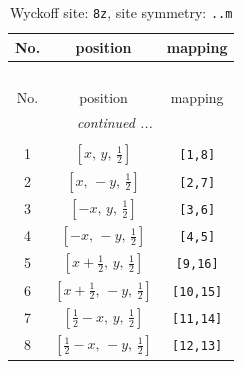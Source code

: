 \documentclass[fleqn,8pt]{jsarticle}
\begin{document}
\begin{longtable}{ccc}
\caption{Wyckoff site: {\tt 8z}, site symmetry: {\tt ..m}}
 \\
 \hline \hline
No. & position & mapping \\ \hline \endfirsthead

\multicolumn{2}{l}{\tablename\ \thetable{}} \\
 \hline \hline
No. & position & mapping \\ \hline \endhead

 \hline \hline
\multicolumn{2}{r}{\footnotesize\it continued ...} \\ \endfoot

 \hline \hline
\multicolumn{2}{r}{} \\ \endlastfoot

1 & $\left[ x,\, y,\, \frac{1}{2} \right]$ & {\tt [1,8]} \\ \hline
2 & $\left[ x,\, - y,\, \frac{1}{2} \right]$ & {\tt [2,7]} \\ \hline
3 & $\left[ - x,\, y,\, \frac{1}{2} \right]$ & {\tt [3,6]} \\ \hline
4 & $\left[ - x,\, - y,\, \frac{1}{2} \right]$ & {\tt [4,5]} \\ \hline
5 & $\left[ x + \frac{1}{2},\, y,\, \frac{1}{2} \right]$ & {\tt [9,16]} \\ \hline
6 & $\left[ x + \frac{1}{2},\, - y,\, \frac{1}{2} \right]$ & {\tt [10,15]} \\ \hline
7 & $\left[ \frac{1}{2} - x,\, y,\, \frac{1}{2} \right]$ & {\tt [11,14]} \\ \hline
8 & $\left[ \frac{1}{2} - x,\, - y,\, \frac{1}{2} \right]$ & {\tt [12,13]} \\
\end{longtable}
\renewcommand{\arraystretch}{1.2}
\end{document}
